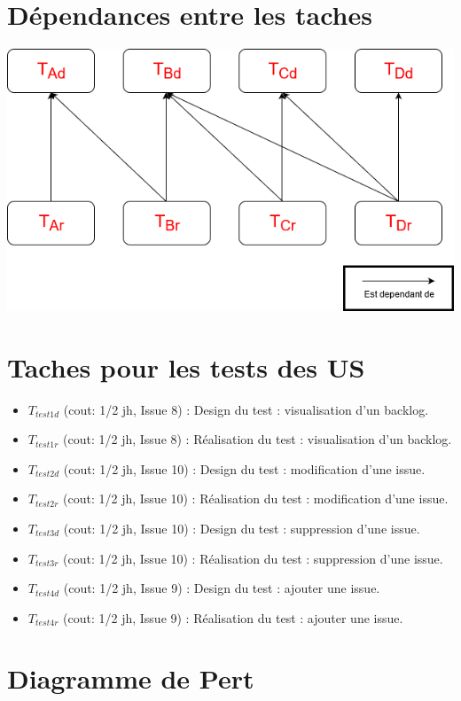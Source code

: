 \documentclass[french]{article}
\begin{document}
\section{Dépendances entre les taches}
\includegraphics[scale=0.55]{rsc/task_dependancy_sprint_1.png}

\section{Taches pour les tests des US}
\begin{itemize}
    \item $T_{test1d}$ (cout: 1/2 jh, Issue 8) : Design du test : visualisation d'un backlog.
    \item $T_{test1r}$ (cout: 1/2 jh, Issue 8) : Réalisation du test : visualisation d'un backlog.
    \item $T_{test2d}$ (cout: 1/2 jh, Issue 10) : Design du test : modification d'une issue.
    \item $T_{test2r}$ (cout: 1/2 jh, Issue 10) : Réalisation du test : modification d'une issue.
    \item $T_{test3d}$ (cout: 1/2 jh, Issue 10) : Design du test : suppression d'une issue.
    \item $T_{test3r}$ (cout: 1/2 jh, Issue 10) : Réalisation du test : suppression d'une issue.
    \item $T_{test4d}$ (cout: 1/2 jh, Issue 9) : Design du test : ajouter une issue.
    \item $T_{test4r}$ (cout: 1/2 jh, Issue 9) : Réalisation du test : ajouter une issue.
\end{itemize}

\section{Diagramme de Pert}
\newpage
{}
\end{document}

